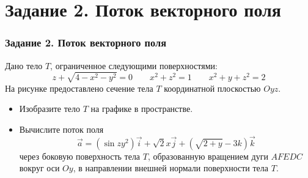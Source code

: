 \section{Задание 2. Поток векторного поля}
\begin{frame}
\frametitle{Задание 2. Поток векторного поля}
Дано тело $T$, ограниченное следующими поверхностями:
\[
  z + \sqrt{4 - x^2 - y^2} = 0 \qquad x^2+z^2 = 1 \qquad x^2 + y + z^2 = 2
\]
На рисунке предоставлено сечение тела $T$ координатной плоскостью
$Oyz$.

\begin{itemize}
\item Изобразите тело $T$ на графике в пространстве.
\item Вычислите поток поля
\[
  \vec a = (\sin zy^2) \vec i + \sqrt{2} x \vec j + (\sqrt{2+y} -3k) \vec k
\]
через боковую поверхность тела $T$, образованную вращением дуги $AFEDC$ 
вокруг оси $Oy$, в направлении внешней нормали поверхности тела $T$.
\end{itemize}

\end{frame}
